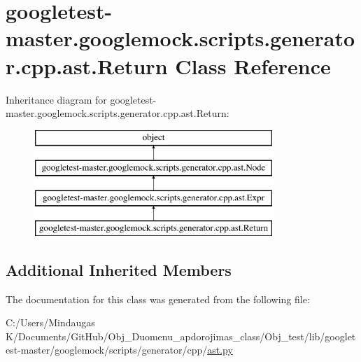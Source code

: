 \hypertarget{classgoogletest-master_1_1googlemock_1_1scripts_1_1generator_1_1cpp_1_1ast_1_1_return}{}\section{googletest-\/master.googlemock.\+scripts.\+generator.\+cpp.\+ast.\+Return Class Reference}
\label{classgoogletest-master_1_1googlemock_1_1scripts_1_1generator_1_1cpp_1_1ast_1_1_return}
Inheritance diagram for googletest-\/master.googlemock.\+scripts.\+generator.\+cpp.\+ast.\+Return\+:\begin{figure}[H]
\begin{center}
\leavevmode
\includegraphics[height=4.000000cm]{d8/d60/classgoogletest-master_1_1googlemock_1_1scripts_1_1generator_1_1cpp_1_1ast_1_1_return}
\end{center}
\end{figure}
\subsection*{Additional Inherited Members}


The documentation for this class was generated from the following file\+:\begin{DoxyCompactItemize}
\item 
C\+:/\+Users/\+Mindaugas K/\+Documents/\+Git\+Hub/\+Obj\+\_\+\+Duomenu\+\_\+apdorojimas\+\_\+class/\+Obj\+\_\+test/lib/googletest-\/master/googlemock/scripts/generator/cpp/\mbox{\hyperlink{_obj__test_2lib_2googletest-master_2googlemock_2scripts_2generator_2cpp_2ast_8py}{ast.\+py}}\end{DoxyCompactItemize}
